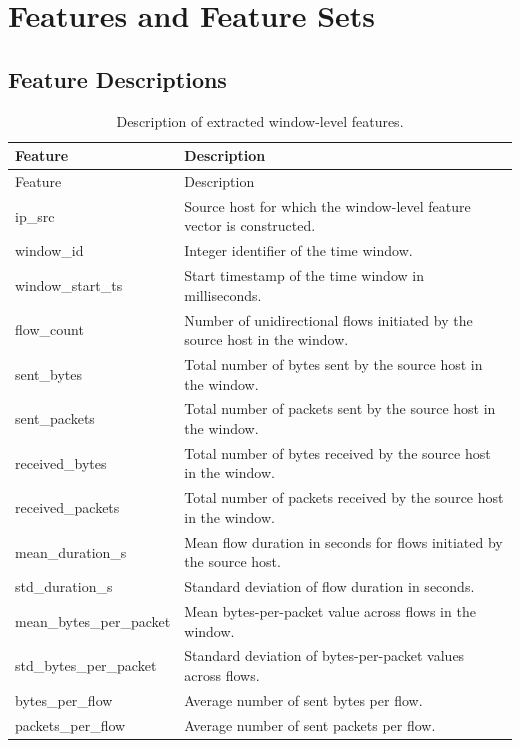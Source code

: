 \chapter{Features and Feature Sets}
\label{app:A}


\section{Feature Descriptions}
\label{app:feature_descriptions}

\begin{longtable}{
    >{\ttfamily\raggedright\arraybackslash}p{}
    >{\raggedright\arraybackslash}p{}
}
\caption{Description of extracted window-level features.}
\label{tab:feature_descriptions}\\
\toprule
Feature & Description \\
\midrule
\endfirsthead

\toprule
Feature & Description \\
\midrule
\endhead

\bottomrule
\endfoot

ip\_src & Source host for which the window-level feature vector is constructed. \\
window\_id & Integer identifier of the time window. \\
window\_start\_ts & Start timestamp of the time window in milliseconds. \\

flow\_count & Number of unidirectional flows initiated by the source host in the window. \\
sent\_bytes & Total number of bytes sent by the source host in the window. \\
sent\_packets & Total number of packets sent by the source host in the window.  \\
received\_bytes & Total number of bytes received by the source host in the window. \\
received\_packets & Total number of packets received by the source host in the window. \\

mean\_duration\_s & Mean flow duration in seconds for flows initiated by the source host. \\
std\_duration\_s & Standard deviation of flow duration in seconds. \\
mean\_bytes\_per\_packet & Mean bytes-per-packet value across flows in the window. \\
std\_bytes\_per\_packet & Standard deviation of bytes-per-packet values across flows. \\
bytes\_per\_flow & Average number of sent bytes per flow. \\
packets\_per\_flow & Average number of sent packets per flow. \\


\end{longtable}
